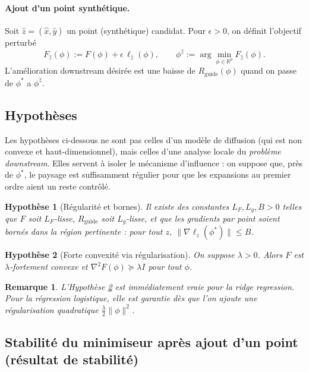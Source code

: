 \documentclass[11pt]{article}
\newtheorem{assumption}{Hypothèse}
\newtheorem{remark}{Remarque}
\begin{document}
\paragraph{Ajout d'un point synthétique.}
Soit $\hat z=(\hat x,\hat y)$ un point (synthétique) candidat. Pour $\epsilon>0$, on définit l'objectif perturbé
\[
F_{\hat z}(\phi) := F(\phi) + \epsilon\,\ell_{\hat z}(\phi),
\qquad
\phi^{\hat z} := \arg\min_{\phi\in\mathbb R^p} F_{\hat z}(\phi).
\]
L'amélioration downstream désirée est une baisse de $R_{\text{guide}}(\phi)$ quand on passe de $\phi^*$ a $\phi^{\hat z}$.

\subsection{Hypothèses}

Les hypothèses ci-dessous ne sont pas celles d'un modèle de diffusion (qui est non convexe et haut-dimensionnel), mais celles d'une analyse locale du \emph{problème downstream}. Elles servent à isoler le mécanisme d'influence : on suppose que, près de $\phi^*$, le paysage est suffisamment régulier pour que les expansions au premier ordre aient un reste contrôlé.

\begin{assumption}[Régularité et bornes]
\label{ass:reg}
Il existe des constantes $L_F,L_g,B>0$ telles que $F$ soit $L_F$-lisse, $R_{\text{guide}}$ soit $L_g$-lisse, et que les gradients par point soient bornés dans la région pertinente : pour tout $z$, $\|\nabla \ell_z(\phi^*)\|\le B$.
\end{assumption}

\begin{assumption}[Forte convexité via régularisation]
\label{ass:sc}
On suppose $\lambda>0$. Alors $F$ est $\lambda$-fortement convexe et $\nabla^2F(\phi)\succeq \lambda I$ pour tout $\phi$.
\end{assumption}

\begin{remark}
L'Hypothèse \ref{ass:sc} est immédiatement vraie pour la ridge regression.
Pour la régression logistique, elle est garantie dès que l'on ajoute une régularisation quadratique $\frac{\lambda}{2}\|\phi\|^2$.
\end{remark}

\subsection{Stabilité du minimiseur après ajout d'un point (résultat de stabilité)}
\end{document}
